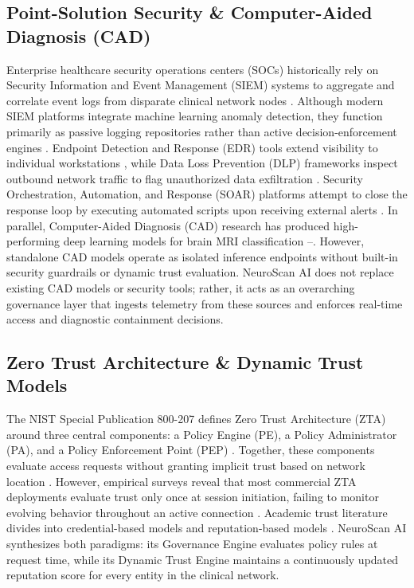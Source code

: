 \documentclass[conference]{IEEEtran}
\begin{document}
\subsection{Point-Solution Security \& Computer-Aided Diagnosis (CAD)}
Enterprise healthcare security operations centers (SOCs) historically rely on Security Information and Event Management (SIEM) systems to aggregate and correlate event logs from disparate clinical network nodes \cite{gonzalez2021}. Although modern SIEM platforms integrate machine learning anomaly detection, they function primarily as passive logging repositories rather than active decision-enforcement engines \cite{gonzalez2021}. Endpoint Detection and Response (EDR) tools extend visibility to individual workstations \cite{kaur2024}, while Data Loss Prevention (DLP) frameworks inspect outbound network traffic to flag unauthorized data exfiltration \cite{alneyadi2016}. Security Orchestration, Automation, and Response (SOAR) platforms attempt to close the response loop by executing automated scripts upon receiving external alerts \cite{bartwal2022}. In parallel, Computer-Aided Diagnosis (CAD) research has produced high-performing deep learning models for brain MRI classification \cite{deepak2019}--\cite{reshi2022}. However, standalone CAD models operate as isolated inference endpoints without built-in security guardrails or dynamic trust evaluation. NeuroScan AI does not replace existing CAD models or security tools; rather, it acts as an overarching governance layer that ingests telemetry from these sources and enforces real-time access and diagnostic containment decisions.

\subsection{Zero Trust Architecture \& Dynamic Trust Models}
The NIST Special Publication 800-207 defines Zero Trust Architecture (ZTA) around three central components: a Policy Engine (PE), a Policy Administrator (PA), and a Policy Enforcement Point (PEP) \cite{rose2020}. Together, these components evaluate access requests without granting implicit trust based on network location \cite{rose2020}. However, empirical surveys reveal that most commercial ZTA deployments evaluate trust only once at session initiation, failing to monitor evolving behavior throughout an active connection \cite{syed2022}. Academic trust literature divides into credential-based models and reputation-based models \cite{artz2007}. NeuroScan AI synthesizes both paradigms: its Governance Engine evaluates policy rules at request time, while its Dynamic Trust Engine maintains a continuously updated reputation score for every entity in the clinical network.
\end{document}
